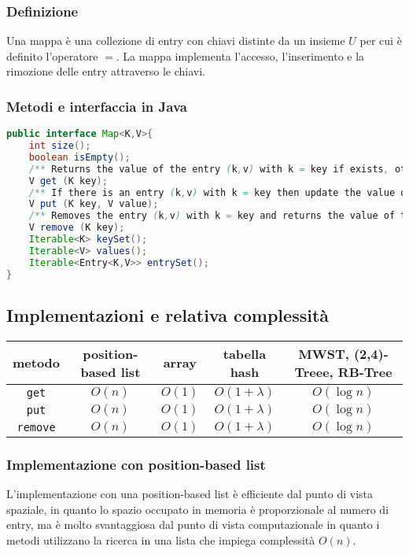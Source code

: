 \documentclass[a4paper]{article}
\begin{document}
\subsubsection*{Definizione}
Una mappa è una collezione di entry con chiavi distinte da un insieme \(U\) per cui è definito l'operatore \(=\). La mappa
implementa l'accesso, l'inserimento e la rimozione delle entry attraverso le chiavi.

\subsubsection*{Metodi e interfaccia in Java}
\begin{lstlisting}[language=Java]
public interface Map<K,V>{
	int size();
	boolean isEmpty();
	/** Returns the value of the entry (k,v) with k = key if exists, otherwise null */
	V get (K key);
	/** If there is an entry (k,v) with k = key then update the value of that entry and returns the old value, otherwise inserts a new entry (key, value) and returns null */
	V put (K key, V value);
	/** Removes the entry (k,v) with k = key and returns the value of the entry, otherwise return null*/
	V remove (K key);
	Iterable<K> keySet();
	Iterable<V> values();
	Iterable<Entry<K,V>> entrySet();
}
\end{lstlisting}

\subsection{Implementazioni e relativa complessità}
\begin{center}
	\begin{tabular}{c | c | c | c | c}
		\textbf{metodo} & \textbf{position-based list} & \textbf{array} & \textbf{tabella hash} & \textbf{MWST, (2,4)-Treee, RB-Tree} \\
		\toprule
		\verb|get| & \(O(n)\) & \(O(1)\) & \(O(1 + \lambda)\) & \(O(\log n)\) \\
		\midrule
		\verb|put| & \(O(n)\) & \(O(1)\) & \(O(1 + \lambda)\) & \(O(\log n)\) \\
		\midrule
		\verb|remove| & \(O(n)\) & \(O(1)\) & \(O(1 + \lambda)\) & \(O(\log n)\) \\
		\bottomrule
	\end{tabular}
\end{center}

\subsubsection*{Implementazione con position-based list}
L'implementazione con una position-based list è efficiente dal punto di vista spaziale, in quanto lo spazio occupato in memoria
è proporzionale al numero di entry, ma è molto svantaggiosa dal punto di vista computazionale in quanto i metodi utilizzano la
ricerca in una lista che impiega complessità \(O(n)\).
\end{document}
